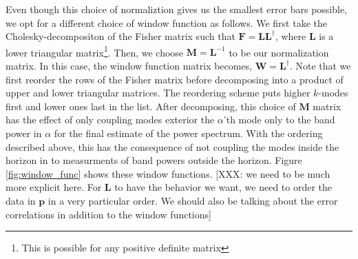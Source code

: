 \documentclass[twocolumn,numberedappendix]{emulateapj} \shorttitle{PSA64}
\begin{document}
Even though this choice of normaliztion gives us the smallest error bars
possible, we opt for a different choice of window function as follows. We
first take the Cholesky-decompositon of the Fisher matrix such that $\mathbf{F}
= \mathbf{L}\mathbf{L}^{\dagger}$, where $\mathbf{L}$ is a lower triangular
matrix\footnote{This is possible for any positive definite matrix}. Then, we
choose ${\mathbf{M}} = \mathbf{L}^{-1}$ to be our normalization
matrix. In this case, the window function matrix becomes,
$\mathbf{W}=\mathbf{L}^{\dagger}$. Note that we first reorder the rows of the
Fisher matrix before decomposing into a product of upper and lower triangular
matrices. The reordering scheme puts higher $k$-modes first and lower ones last
in the list. After decomposing, this choice of $\mathbf{M}$ matrix has the
effect of only coupling modes exterior the $\alpha$'th mode only to the
band power in $\alpha$  for the final estimate of the power spectrum.
With the ordering described above, this has the
consequence of not coupling the modes inside the horizon in to measurments of
band powers outside the horizon. Figure \ref{fig:window_func} shows
these window functions. [XXX: we need to be much more explicit here. For
$\mathbf{L}$ to have the behavior we want, we need to order the data in
$\mathbf{p}$ in a very particular order. We should also be talking about the
error correlations in addition to the window functions]
\end{document}

